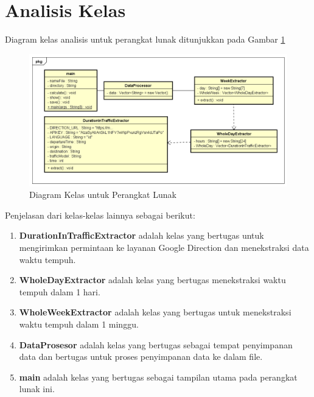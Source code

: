 \section{Analisis Kelas}
\label{sec:analisisclassdiagram}

Diagram kelas analisis untuk perangkat lunak ditunjukkan pada Gambar \ref{fig:classdiagramawal}

\begin{figure}[H]
				\centering		
				\includegraphics[scale=0.4]{Gambar/ClassDiagram.png}
				\caption[Diagram Kelas untuk Perangkat Lunak]{Diagram Kelas untuk Perangkat Lunak}
				\label{fig:classdiagramawal}	
			\end{figure}
Penjelasan dari kelas-kelas lainnya sebagai berikut:
\begin{enumerate}
	\item \textbf{DurationInTrafficExtractor} adalah kelas yang bertugas untuk mengirimkan permintaan ke layanan Google Direction dan menekstraksi data waktu tempuh.
	\item \textbf{WholeDayExtractor} adalah kelas yang bertugas menekstraksi waktu tempuh dalam 1 hari.
	\item \textbf{WholeWeekExtractor} adalah kelas yang bertugas untuk menekstraksi waktu tempuh dalam 1 minggu.
	\item \textbf{DataProsesor} adalah kelas yang bertugas sebagai tempat penyimpanan data dan bertugas untuk proses penyimpanan data ke dalam file.
	\item \textbf{main} adalah kelas yang bertugas sebagai tampilan utama pada perangkat lunak ini.
\end{enumerate}